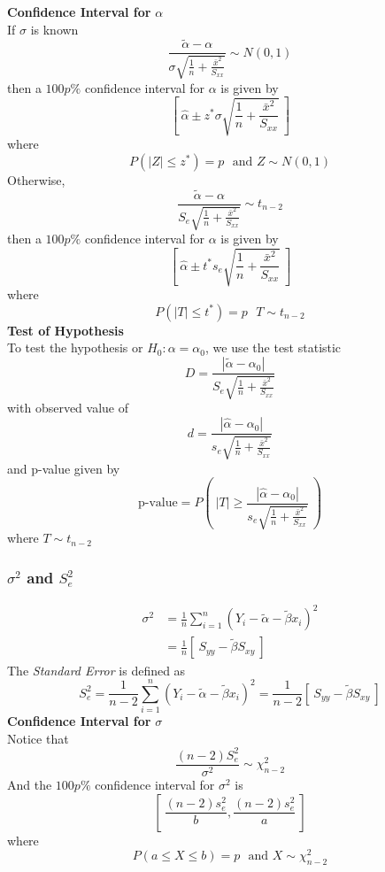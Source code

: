 \documentclass[12pt]{article}
\theoremstyle{definition}
\begin{document}
  \textbf{Confidence Interval for} $\alpha$ \\
  If $\sigma$ is known
  $$\frac{\widetilde{\alpha} - \alpha}{\sigma \sqrt{\frac{1}{n} + \frac{\bar{x}^{2}}{S_{xx}}}} \sim N(0, 1)$$
  then a $100p\%$ confidence interval for $\alpha$ is given by
  $$\left[~ \hat{\alpha} \pm z^{*}\sigma \sqrt{\frac{1}{n} + \frac{\bar{x}^{2}}{S_{xx}}} ~\right]$$
  where
  $$P(|Z| \leq z^{*}) = p ~~~\text{and } Z \sim N(0, 1)$$
  \newline
  Otherwise,
  $$\frac{\widetilde{\alpha} - \alpha}{S_{e}\sqrt{\frac{1}{n} + \frac{\bar{x}^{2}}{S_{xx}}}} \sim t_{n-2}$$
  then a $100p\%$ confidence interval for $\alpha$ is given by
  $$\left[~ \hat{\alpha} \pm t^{*}s_{e}\sqrt{\frac{1}{n} + \frac{\bar{x}^{2}}{S_{xx}}} ~\right]$$
  where
  $$P(|T| \leq t^{*}) = p ~~~ T \sim t_{n-2}$$
  \newline
  \textbf{Test of Hypothesis} \\
  To test the hypothesis or $H_{0}: \alpha = \alpha_{0}$, we use the test statistic
  $$D = \frac{|\widetilde{\alpha} - \alpha_{0}|}{S_{e}\sqrt{\frac{1}{n} + \frac{\bar{x}^{2}}{S_{xx}}}}$$
  with observed value of
  $$d = \frac{|\hat{\alpha} - \alpha_{0}|}{s_{e}\sqrt{\frac{1}{n} + \frac{\bar{x}^{2}}{S_{xx}}}}$$
  and p-value given by
  $$\text{p-value} = P\left(~|T| \geq \frac{|\hat{\alpha} - \alpha_{0}|}{s_{e}\sqrt{\frac{1}{n} + \frac{\bar{x}^{2}}{S_{xx}}}}~\right)$$
  where $T \sim t_{n-2}$

  \subsubsection{$\sigma^{2}$ and $S_{e}^{2}$}
  \begin{align*}
  \sigma^{2} &= \frac{1}{n} \sum_{i=1}^{n} (Y_{i} - \widetilde{\alpha} - \widetilde{\beta}x_{i})^{2} \\
  &= \frac{1}{n}\left[~S_{yy} - \widetilde{\beta}S_{xy}~\right]
  \end{align*}
  The \emph{Standard Error} is defined as
  $$
  S_{e}^{2}
  = \frac{1}{n - 2} \sum_{i=1}^{n} (Y_{i} - \widetilde{\alpha} - \widetilde{\beta}x_{i})^{2}
  = \frac{1}{n - 2}\left[~S_{yy} - \widetilde{\beta}S_{xy}~\right]
  $$
  \textbf{Confidence Interval for} $\sigma$ \\
  Notice that
  $$\frac{(n-2)S_{e}^{2}}{\sigma^{2}} \sim \chi_{n-2}^{2}$$
  And the $100p\%$ confidence interval for $\sigma^{2}$ is
  $$\left[~\frac{(n-2)s_{e}^{2}}{b}, \frac{(n-2)s_{e}^{2}}{a}~\right]$$
  where
  $$P(a \leq X \leq b) = p ~~~\text{and } X \sim \chi_{n-2}^{2}$$
\end{document}

